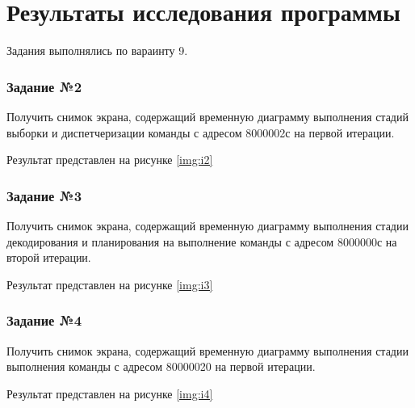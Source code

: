 \chapter*{Результаты исследования программы}
Задания выполнялись по вараинту 9.


\subsection*{Задание №2}
Получить снимок экрана, содержащий временную диаграмму выполнения стадий выборки и диспетчеризации команды с адресом 8000002с на первой итерации.

Результат представлен на рисунке \ref{img:i2}
\clearpage

\subsection*{Задание №3}

Получить снимок экрана, содержащий временную диаграмму выполнения стадии декодирования и планирования на выполнение команды с адресом 8000000с на второй итерации.

Результат представлен на рисунке \ref{img:i3}
\clearpage

\subsection*{Задание №4}

Получить снимок экрана, содержащий временную диаграмму выполнения стадии выполнения команды
с адресом 80000020 на первой итерации.

Результат представлен на рисунке \ref{img:i4}
\clearpage
